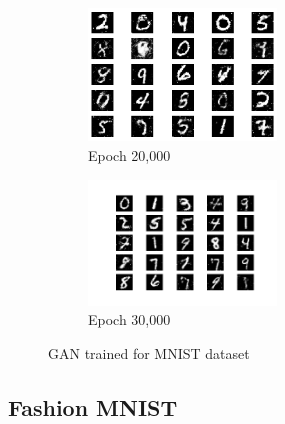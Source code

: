 \documentclass[a4paper]{article}    %
\begin{document}
\begin{figure}[H]
    \hfill
    \begin{subfigure}{0.48\textwidth}
        \centering
        \includegraphics[width=5cm]{20000}
        \caption{Epoch 20,000}
        \label{fig:mnist-epoch20000}
    \end{subfigure}
    \hfill
    \begin{subfigure}{0.48\textwidth}
        \centering
        \includegraphics[width=5cm]{29000}
        \caption{Epoch 30,000}
        \label{fig:mnist-epoch30000}
    \end{subfigure}
    \caption{GAN trained for MNIST dataset} 
    \label{fig:gan-mnist}
\end{figure}


\subsection{Fashion MNIST}

\graphicspath{{../figures/Q9/fashion_mnist/}}
\end{document}
